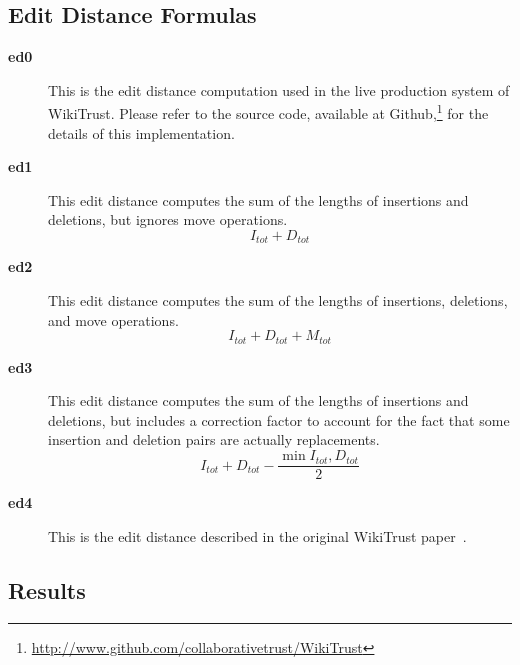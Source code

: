 \subsection{Edit Distance Formulas}

\begin{description}

\item[\textbf{ed0}] This is the edit distance computation used
    in the live production system of WikiTrust.
    Please refer to the source code, available at
    Github,\footnote{\url{http://www.github.com/collaborativetrust/WikiTrust}}
    for the details of this implementation.

\item[\textbf{ed1}] This edit distance computes the sum of the lengths
    of insertions and deletions, but ignores move operations.
    \begin{equation*}
    I_{tot} + D_{tot}
    \end{equation*}

\item[\textbf{ed2}] This edit distance computes the sum of the lengths
    of insertions, deletions, and move operations.
    \begin{equation*}
    I_{tot} + D_{tot} + M_{tot}
    \end{equation*}

\item[\textbf{ed3}] This edit distance computes the sum of the lengths
    of insertions and deletions, but includes a correction factor
    to account for the fact that some insertion and deletion pairs
    are actually replacements.
    \begin{equation*}
    I_{tot} + D_{tot} - \frac{\min{I_{tot}, D_{tot}}}{2}
    \end{equation*}

\item[\textbf{ed4}] This is the edit distance described in
    the original WikiTrust paper~\cite{Adler2007}.

\end{description}

\subsection{Results}


